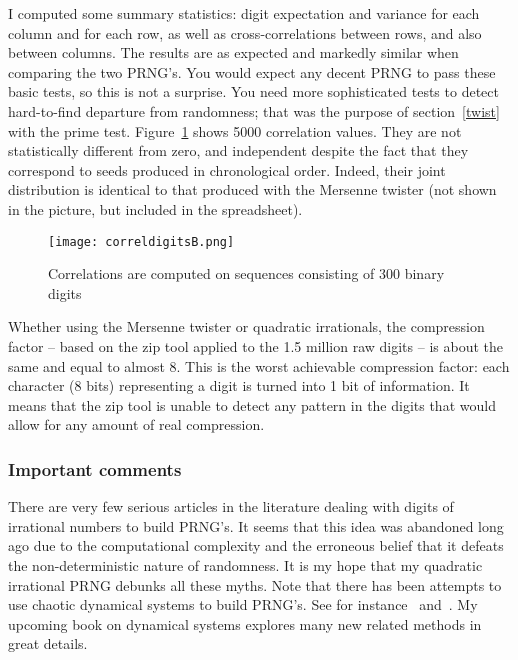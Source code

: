 \documentclass[oneside,10pt]{book}
\begin{document}
I computed some summary statistics:  digit expectation and variance for each column and for each row, as well as cross-correlations between rows, and also between columns. The results are as expected and markedly similar when comparing the two PRNG's. You would expect any decent PRNG to pass these basic tests, so this is not a surprise. You need more sophisticated tests to detect hard-to-find departure from randomness; that was the purpose of section~\ref{twist} with the prime test.  Figure~\ref{fig:rn1digyt} shows 5000 correlation values. They are not statistically different from zero, and 
 independent despite the fact that they correspond to seeds produced in chronological order. Indeed, their joint distribution is identical to that produced with the Mersenne twister (not shown in the picture, but included in the spreadsheet).   

\begin{figure}%
\centering
\texttt{[image: correldigitsB.png]}  
\caption{Correlations are computed on sequences consisting of 300 binary digits}
\label{fig:rn1digyt}
\end{figure}

Whether using the Mersenne twister or quadratic irrationals, the compression factor -- based on the zip tool applied to the 1.5 million raw digits -- is
 about the same and equal to almost 8. This is the worst achievable compression factor: each character (8 bits) representing a digit is
 turned into 1 bit of information. It means that the zip tool is unable to detect any pattern in the digits that would allow
 for any amount of real compression.   

\subsubsection{Important comments}

There are very few serious articles in the literature dealing with digits of irrational numbers  to build PRNG's. It seems that this idea was abandoned long ago due to the computational complexity and the erroneous belief that it defeats 
 the non-deterministic nature of randomness. It is my hope that my quadratic irrational PRNG debunks all these myths. Note that there has been attempts to use chaotic dynamical systems to build PRNG's. See for instance~\cite{loginew} and~\cite{expmdb2002}. My upcoming book on dynamical systems explores  many new related methods in great details. 
\end{document}
